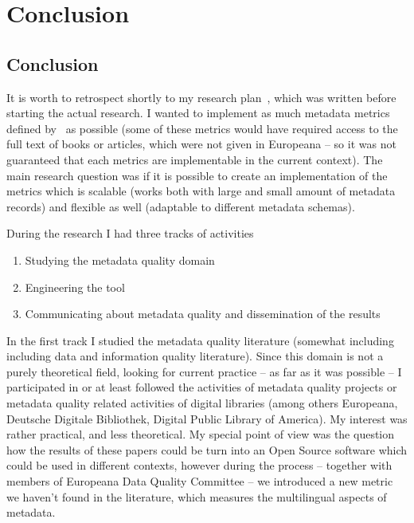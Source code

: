 \chapter{Conclusion}

\section{Conclusion}

It is worth to retrospect shortly to my research plan~\cite{kiraly2015a}, which was written before starting the actual research. I wanted to implement as much metadata metrics defined by~\cite{bruce-hillmann2004, ochoa-duval2009} as possible (some of these metrics would have required access to the full text of books or articles, which were not given in Europeana -- so it was not guaranteed that each metrics are implementable in the current context). The main research question was if it is possible to create an implementation of the metrics which is scalable (works both with large and small amount of metadata records) and flexible as well (adaptable to different metadata schemas).

During the research I had three tracks of activities

\begin{enumerate}
  \setlength{\parskip}{0pt}
  \setlength{\itemsep}{0pt plus 1pt}
\item Studying the metadata quality domain
\item Engineering the tool
\item Communicating about metadata quality and dissemination of the results
\end{enumerate}

In the first track I studied the metadata quality literature (somewhat including including data and information quality literature). Since this domain is not a purely theoretical field, looking for current practice -- as far as it was possible -- I participated in or at least followed the activities of metadata quality projects or metadata quality related activities of digital libraries (among others Europeana, Deutsche Digitale Bibliothek, Digital Public Library of America). My interest was rather practical, and less theoretical. My special point of view was the question how the results of these papers could be turn into an Open Source software which could be used in different contexts, however during the process -- together with members of Europeana Data Quality Committee -- we introduced a new metric we haven't found in the literature, which measures the multilingual aspects of metadata.

